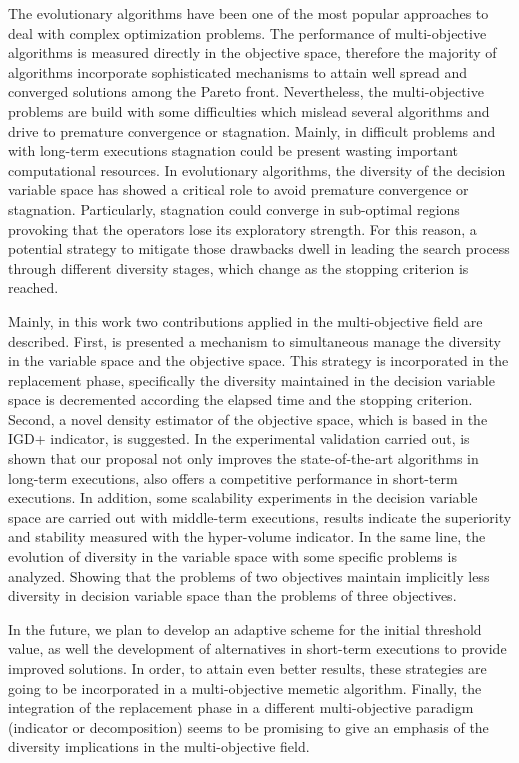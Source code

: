 The evolutionary algorithms have been one of the most popular approaches to deal with complex optimization problems.
%
The performance of multi-objective algorithms is measured directly in the objective space, therefore the majority of algorithms incorporate sophisticated mechanisms to attain well spread and converged solutions among the Pareto front.
%
Nevertheless, the multi-objective problems are build with some difficulties which mislead several algorithms and drive to premature convergence or stagnation.
%
Mainly, in difficult problems and with long-term executions stagnation could be present wasting important computational resources.
%
In evolutionary algorithms, the diversity of the decision variable space has showed a critical role to avoid premature convergence or stagnation.
%
Particularly, stagnation could converge in sub-optimal regions provoking that the operators lose its exploratory strength.
%
For this reason, a potential strategy to mitigate those drawbacks dwell in leading the search process through different diversity stages, which change as the stopping criterion is reached.

Mainly, in this work two contributions applied in the multi-objective field are described.
%
First, is presented a mechanism to simultaneous manage the diversity in the variable space and the objective space.
%
This strategy is incorporated in the replacement phase, specifically the diversity maintained in the decision variable space is decremented according the elapsed time and the stopping criterion.
%
Second, a novel density estimator of the objective space, which is based in the IGD+ indicator, is suggested.
%
In the experimental validation carried out, is shown that our proposal not only improves the state-of-the-art algorithms in long-term executions, also offers a competitive performance in short-term executions.
%
%
In addition, some scalability experiments in the decision variable space are carried out with middle-term executions, results indicate the superiority and stability measured with the hyper-volume indicator.
%
In the same line, the evolution of diversity in the variable space with some specific problems is analyzed.
%
Showing that the problems of two objectives maintain implicitly less diversity in decision variable space than the problems of three objectives.
%


In the future, we plan to develop an adaptive scheme for the initial threshold value, as well the development of alternatives in short-term executions to provide improved solutions.
%
In order, to attain even better results, these strategies are going to be incorporated in a multi-objective memetic algorithm.
%
Finally, the integration of the replacement phase in a different multi-objective paradigm (indicator or decomposition) seems to be promising to give an emphasis of the diversity implications in the multi-objective field.

